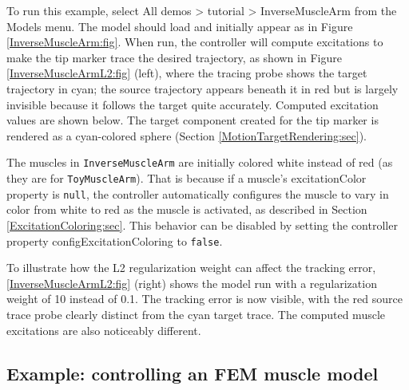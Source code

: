 To run this example, select {\sf All demos > tutorial > InverseMuscleArm} from
the {\sf Models} menu. The model should load and initially appear as in Figure
\ref{InverseMuscleArm:fig}. When run, the controller will compute excitations to
make the tip marker trace the desired trajectory, as shown in Figure
\ref{InverseMuscleArmL2:fig} (left), where the tracing probe shows the
target trajectory in cyan; the source trajectory appears beneath it in red but
is largely invisible because it follows the target quite accurately.  Computed
excitation values are shown below. The target component created for the tip
marker is rendered as a cyan-colored sphere
(Section \ref{MotionTargetRendering:sec}).

\begin{sideblock}
The muscles in {\tt InverseMuscleArm} are initially colored white instead of
red (as they are for {\tt ToyMuscleArm}). That is because if a muscle's {\sf
excitationColor} property is {\tt null}, the controller automatically
configures the muscle to vary in color from white to red as the muscle is
activated, as described in Section \ref{ExcitationColoring:sec}.  This
behavior can be disabled by setting the controller property {\sf
configExcitationColoring} to {\tt false}.
\end{sideblock}

To illustrate how the L2 regularization weight can affect the tracking error,
\ref{InverseMuscleArmL2:fig} (right) shows the model run with a regularization
weight of 10 instead of 0.1. The tracking error is now visible, with the red
source trace probe clearly distinct from the cyan target trace. The computed
muscle excitations are also noticeably different.

\subsection{Example: controlling an FEM muscle model}
\label{InverseMuscleFem:sec}

